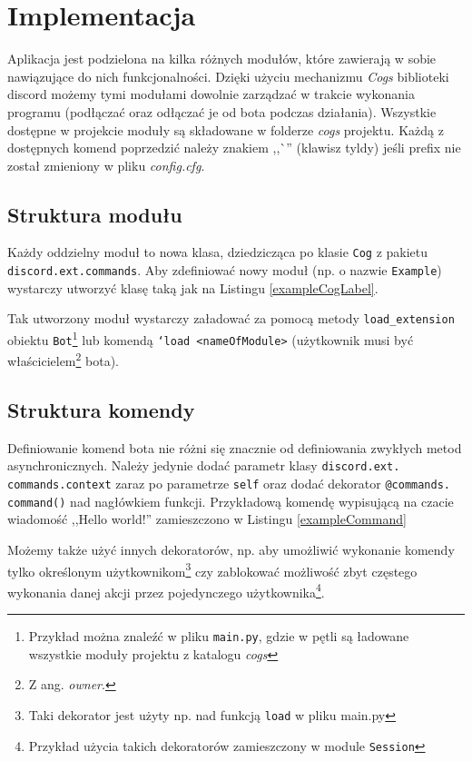 \documentclass[shortabstract,inz]{iithesis}
\begin{document}
	\chapter{Implementacja}
		Aplikacja jest podzielona na kilka różnych modułów, które zawierają w sobie nawiązujące do nich funkcjonalności. Dzięki użyciu mechanizmu \textit{Cogs}\cite{discordpycogs} biblioteki discord możemy tymi modułami dowolnie zarządzać w trakcie wykonania programu (podłączać oraz odłączać je od bota podczas działania). Wszystkie dostępne w projekcie moduły są składowane w folderze \textit{cogs} projektu.
		Każdą z dostępnych komend poprzedzić należy znakiem ,,\`{ }'' (klawisz tyldy) jeśli prefix nie został zmieniony w pliku \textit{config.cfg}.  
		\section{Struktura modułu}
		Każdy oddzielny moduł to nowa klasa, dziedzicząca po klasie \texttt{Cog} z pakietu \texttt{discord.ext.commands}. Aby zdefiniować nowy moduł (np. o nazwie \texttt{Example}) wystarczy utworzyć klasę taką jak na Listingu \ref{exampleCogLabel}. 
		
		
		Tak utworzony moduł wystarczy załadować za pomocą metody \texttt{load\_extension} obiektu \texttt{Bot}\footnote{Przykład można znaleźć w pliku \texttt{main.py}, gdzie w pętli są ładowane wszystkie moduły projektu z katalogu \textit{cogs}} lub komendą \texttt{`load <nameOfModule>} (użytkownik musi być właścicielem\footnote{Z ang. \textit{owner}.} bota).  
		
		\section{Struktura komendy}
		Definiowanie komend bota nie różni się znacznie od definiowania zwykłych metod asynchronicznych. Należy jedynie dodać parametr klasy \texttt{discord.ext.
			commands.context} zaraz po parametrze \texttt{self} oraz dodać dekorator \texttt{@commands.
			command()} nad nagłówkiem funkcji. Przykładową komendę wypisującą na czacie wiadomość ,,Hello world!'' zamieszczono w Listingu \ref{exampleCommand}
		
		
		
		Możemy także użyć innych dekoratorów, np. aby umożliwić wykonanie komendy tylko określonym użytkownikom\footnote{Taki dekorator jest użyty np. nad funkcją \texttt{load} w pliku main.py} czy zablokować możliwość zbyt częstego wykonania danej akcji przez pojedynczego użytkownika\footnote{Przykład użycia takich dekoratorów zamieszczony w module \texttt{Session}}.
		
\end{document}
